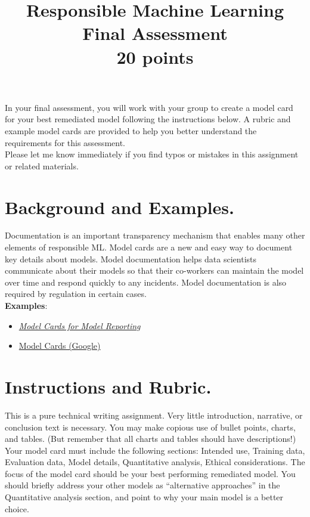 \documentclass[fleqn]{article}
\title{Responsible Machine Learning\\\Large{Final Assessment}\\\Large{20 points}}
\begin{document}
\maketitle

\noindent In your final assessment, you will work with your group to create a model card for your best remediated model following the instructions below. A rubric and example model cards are provided to help you better understand the requirements for this assessment.\\

\noindent Please let me know immediately if you find typos or mistakes in this assignment or related materials. 

\section{Background and Examples.}

Documentation is an important transparency mechanism that enables many other elements of responsible ML. Model cards are a new and easy way to document key details about models. Model documentation helps data scientists communicate about their models so that their co-workers can maintain the model over time and respond quickly to any incidents. Model documentation is also required by regulation in certain cases.\\ 

\noindent\textbf{Examples}:
\begin{itemize}
	\item \href{https://arxiv.org/pdf/1810.03993.pdf}{\textit{Model Cards for Model Reporting}}
	\item \href{https://modelcards.withgoogle.com/about}{Model Cards (Google)}
\end{itemize}

\section{Instructions and Rubric.}

This is a pure technical writing assignment. Very little introduction, narrative, or conclusion text is necessary. You may make copious use of bullet points, charts, and tables. (But remember that all charts and tables should have descriptions!)\\

\noindent Your model card must include the following sections: Intended use, Training data,
Evaluation data, Model details, Quantitative analysis, Ethical considerations. The focus of the model card should be your best performing remediated model. You should briefly address your other models as ``alternative approaches'' in the Quantitative analysis section, and point to why your main model is a better choice.\\
 
\end{document}
